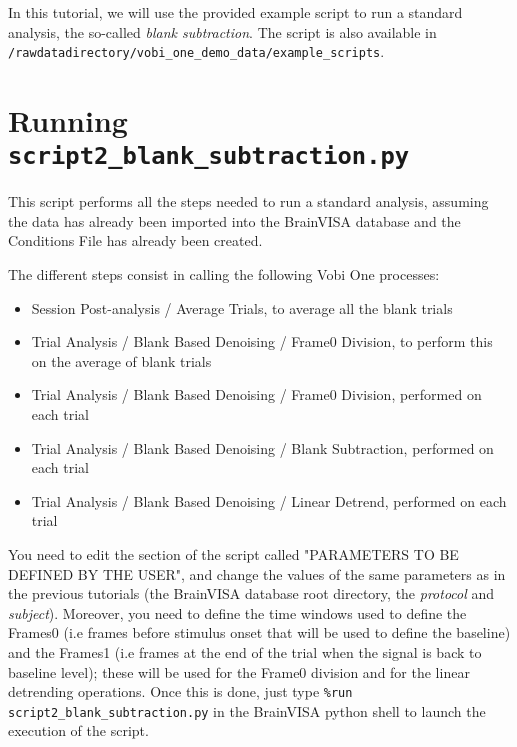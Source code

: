 In this tutorial, we will use the provided example script to run a standard analysis, the so-called {\em blank subtraction}.
The script is also available in \texttt{/rawdatadirectory/vobi\_one\_demo\_data/example\_scripts}.



\section{Running \texttt{script2\_blank\_subtraction.py}}

This script performs all the steps needed to run a standard analysis, assuming the data has already been imported into
the BrainVISA database and the Conditions File has already been created.

The different steps consist in calling the following Vobi One processes:
\begin{itemize}
  \item Session Post-analysis / Average Trials, to average all the blank trials
  \item Trial Analysis / Blank Based Denoising / Frame0 Division, to perform this on the average of blank trials
  \item Trial Analysis / Blank Based Denoising / Frame0 Division, performed on each trial
  \item Trial Analysis / Blank Based Denoising / Blank Subtraction, performed on each trial
  \item Trial Analysis / Blank Based Denoising / Linear Detrend, performed on each trial
\end{itemize}


You need to edit the section of the script called "PARAMETERS TO BE DEFINED BY THE USER", and change the values of the same parameters as in the previous tutorials (the BrainVISA database root directory, the \textit{protocol} and \textit{subject}). Moreover, you need to define the time windows used to define the Frames0 (i.e frames before stimulus onset that will be used to define the baseline) and the Frames1 (i.e frames at the end of the trial when the signal is back to baseline level); these will be used for the Frame0 division and for the linear detrending operations. Once this is done, just type \texttt{\%run script2\_blank\_subtraction.py} in the BrainVISA python shell to launch the execution of the script.


